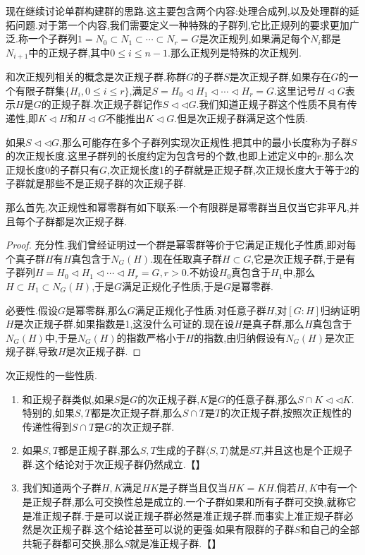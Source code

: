 现在继续讨论单群构建群的思路.这主要包含两个内容:处理合成列,以及处理群的延拓问题.对于第一个内容,我们需要定义一种特殊的子群列,它比正规列的要求更加广泛.称一个子群列$1=N_0\subset N_1\subset\cdots\subset N_r=G$是次正规列,如果满足每个$N_i$都是$N_{i+1}$中的正规子群,其中$0\le i\le n-1$.那么正规列是特殊的次正规列.

和次正规列相关的概念是次正规子群.称群$G$的子群$S$是次正规子群,如果存在$G$的一个有限子群集$\{H_i,0\le i\le r\}$,满足$S=H_0\triangleleft H_1\triangleleft\cdots\triangleleft H_r=G$.这里记号$H\triangleleft G$表示$H$是$G$的正规子群.次正规子群记作$S\triangleleft\triangleleft G$.我们知道正规子群这个性质不具有传递性,即$K\triangleleft H$和$H\triangleleft G$不能推出$K\triangleleft G$.但是次正规子群满足这个性质.

如果$S\triangleleft\triangleleft G$,那么可能存在多个子群列实现次正规性.把其中的最小长度称为子群$S$的次正规长度.这里子群列的长度约定为包含号的个数,也即上述定义中的$r$.那么次正规长度0的子群只有$G$,次正规长度1的子群就是正规子群,次正规长度大于等于2的子群就是那些不是正规子群的次正规子群.

那么首先,次正规性和幂零群有如下联系:一个有限群是幂零群当且仅当它非平凡,并且每个子群都是次正规子群.
\begin{proof}
	
	充分性.我们曾经证明过一个群是幂零群等价于它满足正规化子性质,即对每个真子群$H$有$H$真包含于$N_G(H)$.现在任取真子群$H\subset G$,它是次正规子群,于是有子群列$H=H_0\triangleleft H_1\triangleleft\cdots\triangleleft H_r=G,r>0$.不妨设$H_0$真包含于$H_1$中,那么$H\subset H_1\subset N_G(H)$,于是$G$满足正规化子性质,于是$G$是幂零群.
	
	必要性.假设$G$是幂零群,那么$G$满足正规化子性质.对任意子群$H$,对$[G:H]$归纳证明$H$是次正规子群.如果指数是1,这没什么可证的.现在设$H$是真子群,那么$H$真包含于$N_G(H)$中,于是$N_G(H)$的指数严格小于$H$的指数,由归纳假设有$N_G(H)$是次正规子群,导致$H$是次正规子群.
	
\end{proof}

次正规性的一些性质.
\begin{enumerate}
	\item 和正规子群类似,如果$S$是$G$的次正规子群,$K$是$G$的任意子群,那么$S\cap K\triangleleft\triangleleft K$.特别的,如果$S,T$都是次正规子群,那么$S\cap T$是$T$的次正规子群,按照次正规性的传递性得到$S\cap T$是$G$的次正规子群.
	\item 如果$S,T$都是正规子群,那么$S,T$生成的子群$\langle S,T\rangle$就是$ST$,并且这也是个正规子群.这个结论对于次正规子群仍然成立.【】
	\item 我们知道两个子群$H,K$满足$HK$是子群当且仅当$HK=KH$.倘若$H,K$中有一个是正规子群,那么可交换性总是成立的.一个子群如果和所有子群可交换,就称它是准正规子群.于是可以说正规子群必然是准正规子群.而事实上准正规子群必然是次正规子群.这个结论甚至可以说的更强:如果有限群的子群$S$和自己的全部共轭子群都可交换,那么$S$就是准正规子群.【】
\end{enumerate}


